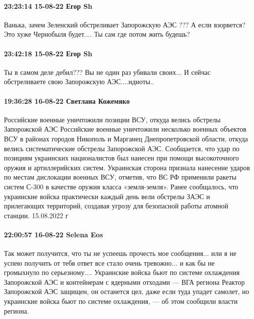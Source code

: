 \paragraph{23:23:14 15-08-22 Егор Sh}

Ванька, зачем Зеленский обстреливает Запорожскую АЭС ??? А если взорвется? Это
хуже Чернобыля будет.... Ты сам где потом жить будешь?

\paragraph{23:42:18 15-08-22 Егор Sh}

Ты в самом деле дебил??? Вы не один раз убивали своих... И сейчас обстреливаете
свою Запорожскую АЭС....идиоты..

\paragraph{19:36:28 16-08-22 Светлана Кожемяко}

\obeycr
Российские военные уничтожили позиции ВСУ, откуда велись обстрелы Запорожской АЭС
Российские военные уничтожили несколько военных объектов ВСУ в районах городов Никополь и Марганец Днепропетровской области, откуда велись систематические обстрелы Запорожской АЭС.
Сообщается, что удар по позициям украинских националистов был нанесен при помощи высокоточного оружия и артиллерийских систем.
Украинская сторона признала нанесение ударов по местам дислокации военных ВСУ, отметив, что ВС РФ применили ракеты систем С-300 в качестве оружия класса «земля-земля».
Ранее сообщалось, что украинские войска практически каждый день вели обстрелы ЗАЭС и прилегающих территорий, создавая угрозу для безопасной работы атомной станции. 15.08.2022 г
\restorecr

\paragraph{22:00:57 16-08-22 Selena Eos}

\obeycr
Так может получится, что ты не успеешь прочесть мое сообщения... или я не успею получить от тебя ответ
все стало очень тревожно... и как бы не громыхнуло по серьезному....
Украинские войска бьют по системе охлаждения Запорожской АЭС и контейнерам с ядерными отходами — ВГА региона
Реактор Запорожской АЭС защищен, он останется цел, даже если туда упадет самолет, но украинские войска бьют по системе охлаждения, — об этом сообщили власти региона.
\restorecr


